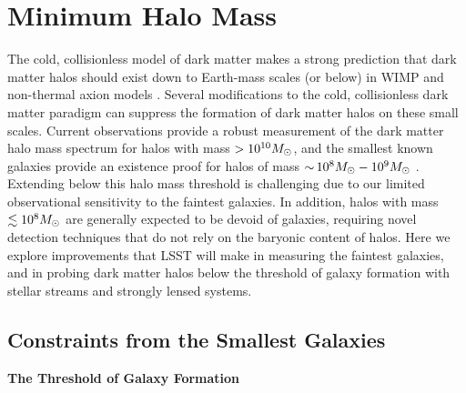 \section{Minimum Halo Mass}
\label{sec:halo_mass}

The cold, collisionless model of dark matter makes a strong prediction that dark matter halos should exist down to Earth-mass scales (or below) in WIMP and non-thermal axion models \citep{Green:2003un,1412.5930}.
Several modifications to the cold, collisionless dark matter paradigm can suppress the formation of dark matter halos on these small scales.
Current observations provide a robust measurement of the dark matter halo mass spectrum for halos with mass $> 10^{10}M_\odot$, and the smallest known galaxies provide an existence proof for halos of mass $ {\sim}\, 10^8 M_\odot - 10^9 M_\odot$ \citep{behroozi2018,Jethwa:2018,Kim:2017iwr,Nadler:2018}. 
Extending below this halo mass threshold is challenging due to our limited observational sensitivity to the faintest galaxies.
In addition, halos with mass $\lesssim 10^8 M_\odot$ are generally expected to be devoid of galaxies, requiring novel detection techniques that do not rely on the baryonic content of halos.
Here we explore improvements that LSST will make in measuring the faintest galaxies, and in probing dark matter halos below the threshold of galaxy formation with stellar streams and strongly lensed systems.

\subsection{Constraints from the Smallest Galaxies } 
\label{sec:smallest_galaxies}


\vspace{1em} \noindent \textbf{The Threshold of Galaxy Formation}

